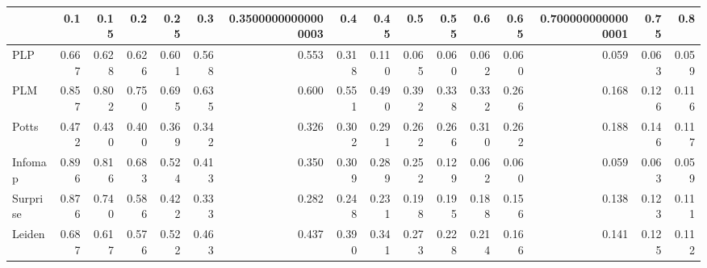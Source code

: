 \begin{tabular}{lrrrrrrrrrrrrrrr}
\toprule
{} &   0.1 &  0.15 &   0.2 &  0.25 &   0.3 & 0.35000000000000003 &   0.4 &  0.45 &   0.5 &  0.55 &   0.6 &  0.65 & 0.7000000000000001 &  0.75 &   0.8 \\
\midrule
PLP      & 0.667 & 0.628 & 0.626 & 0.601 & 0.568 &               0.553 & 0.318 & 0.110 & 0.065 & 0.060 & 0.062 & 0.060 &              0.059 & 0.063 & 0.059 \\
PLM      & 0.857 & 0.802 & 0.750 & 0.695 & 0.635 &               0.600 & 0.551 & 0.490 & 0.392 & 0.338 & 0.332 & 0.266 &              0.168 & 0.126 & 0.116 \\
Potts    & 0.472 & 0.430 & 0.400 & 0.369 & 0.342 &               0.326 & 0.302 & 0.291 & 0.262 & 0.266 & 0.310 & 0.262 &              0.188 & 0.146 & 0.117 \\
Infomap  & 0.896 & 0.816 & 0.683 & 0.524 & 0.413 &               0.350 & 0.309 & 0.289 & 0.252 & 0.129 & 0.062 & 0.060 &              0.059 & 0.063 & 0.059 \\
Surprise & 0.876 & 0.740 & 0.586 & 0.422 & 0.333 &               0.282 & 0.248 & 0.231 & 0.198 & 0.195 & 0.188 & 0.156 &              0.138 & 0.123 & 0.111 \\
Leiden   & 0.687 & 0.617 & 0.576 & 0.522 & 0.463 &               0.437 & 0.390 & 0.341 & 0.273 & 0.228 & 0.214 & 0.166 &              0.141 & 0.125 & 0.112 \\
\bottomrule
\end{tabular}
